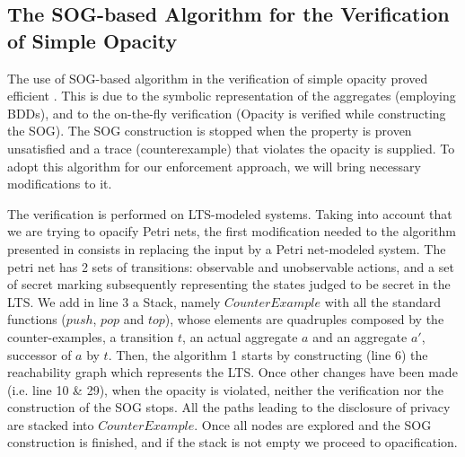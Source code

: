 \subsection{The SOG-based Algorithm for the Verification of Simple Opacity}
The use of SOG-based algorithm in the verification of simple opacity proved efficient \cite{bourouis2015checking}. This is due to the symbolic representation of the aggregates (employing BDDs), and to the on-the-fly verification (Opacity is verified while constructing the SOG). The SOG construction is stopped when the property is proven unsatisfied and a trace (counterexample) that violates the opacity is supplied. To adopt this algorithm for our enforcement approach, we will bring necessary modifications to it.


The verification is performed on LTS-modeled systems. Taking into account that we are trying to opacify Petri nets, the first modification needed to the algorithm presented in \cite{bourouis2015checking} consists in replacing the input by a Petri net-modeled system. The petri net has 2 sets of transitions: observable and unobservable actions, and a set of secret marking subsequently representing the states judged to be secret in the LTS.  We add in line 3 a Stack, namely $CounterExample$  with all the standard functions ($push$, $pop$ and $top$), whose elements are quadruples composed by the counter-examples, a transition $t$, an actual aggregate $a$ and an aggregate $a'$, successor of $a$ by $t$. Then, the algorithm 1 starts by constructing (line 6) the reachability graph which represents the LTS. Once other changes have been made (i.e. line 10 \& 29), when the opacity is violated, neither the verification nor the construction of the SOG stops. All the paths leading to the disclosure of privacy are stacked into $CounterExample$. Once all nodes are explored and the SOG construction is finished, and if the stack is not empty we proceed to opacification.
